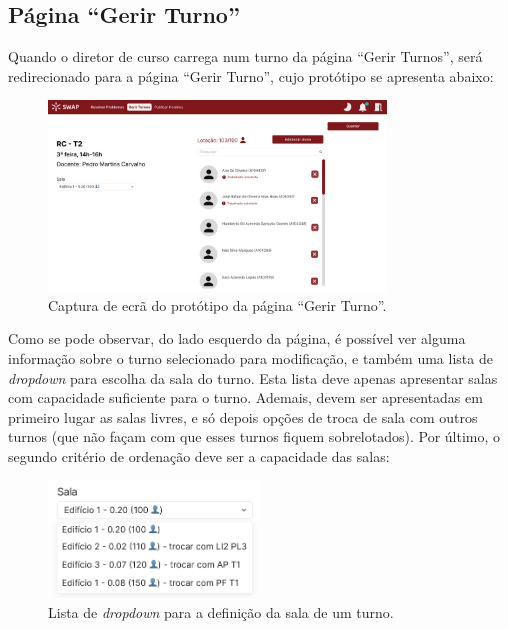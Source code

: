\documentclass[12pt, a4paper]{article}
\begin{document}
\subsection{Página ``Gerir Turno''}

Quando o diretor de curso carrega num turno da página ``Gerir Turnos'', será redirecionado para a
página ``Gerir Turno'', cujo protótipo se apresenta abaixo:

\begin{figure}[H]
    \centering
    \includegraphics[width=0.8\textwidth]{res/prototype/gerir-turno.png}
    \caption{Captura de ecrã do protótipo da página ``Gerir Turno''.}
    \label{gerir-turno}
\end{figure}

Como se pode observar, do lado esquerdo da página, é possível ver alguma informação sobre o turno
selecionado para modificação, e também uma lista de \emph{dropdown} para escolha da sala do turno.
Esta lista deve apenas apresentar salas com capacidade suficiente para o turno. Ademais, devem ser
apresentadas em primeiro lugar as salas livres, e só depois opções de troca de sala com outros
turnos (que não façam com que esses turnos fiquem sobrelotados). Por último, o segundo critério de
ordenação deve ser a capacidade das salas:

\begin{figure}[H]
    \centering
    \includegraphics[width=0.5\textwidth]{res/prototype/gerir-turno-dropdown-salas.png}
    \caption{Lista de \emph{dropdown} para a definição da sala de um turno.}
    \label{gerir-turno-dropdown-salas}
\end{figure}
\end{document}
